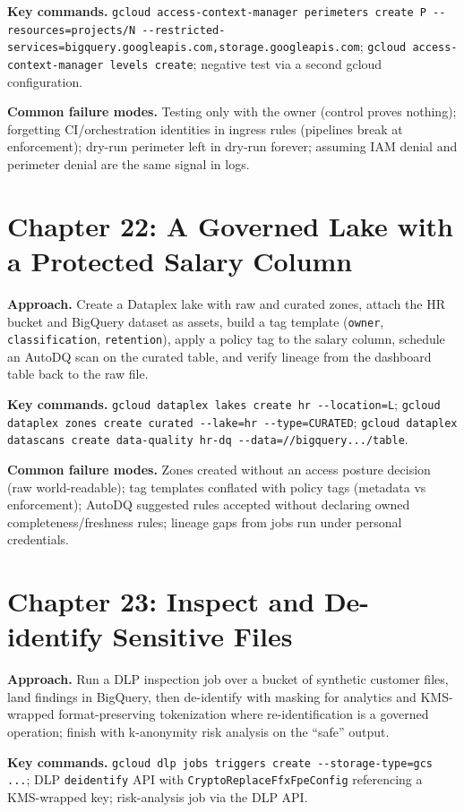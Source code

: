 \textbf{Key commands.} \texttt{gcloud access-context-manager perimeters create P
-{}-resources=projects/N -{}-restricted-services=bigquery.googleapis.com,storage.googleapis.com};
\texttt{gcloud access-context-manager levels create}; negative test via a second gcloud
configuration.

\textbf{Common failure modes.} Testing only with the owner (control proves nothing); forgetting
CI/orchestration identities in ingress rules (pipelines break at enforcement); dry-run perimeter
left in dry-run forever; assuming IAM denial and perimeter denial are the same signal in logs.

\section{Chapter 22: A Governed Lake with a Protected Salary Column}
\textbf{Approach.} Create a Dataplex lake with raw and curated zones, attach the HR bucket and
BigQuery dataset as assets, build a tag template (\texttt{owner}, \texttt{classification},
\texttt{retention}), apply a policy tag to the salary column, schedule an AutoDQ scan on the
curated table, and verify lineage from the dashboard table back to the raw file.

\textbf{Key commands.} \texttt{gcloud dataplex lakes create hr -{}-location=L};
\texttt{gcloud dataplex zones create curated -{}-lake=hr -{}-type=CURATED};
\texttt{gcloud dataplex datascans create data-quality hr-dq -{}-data=//bigquery.../table}.

\textbf{Common failure modes.} Zones created without an access posture decision (raw world-readable);
tag templates conflated with policy tags (metadata vs enforcement); AutoDQ suggested rules accepted
without declaring owned completeness/freshness rules; lineage gaps from jobs run under personal
credentials.

\section{Chapter 23: Inspect and De-identify Sensitive Files}
\textbf{Approach.} Run a DLP inspection job over a bucket of synthetic customer files, land
findings in BigQuery, then de-identify with masking for analytics and KMS-wrapped format-preserving
tokenization where re-identification is a governed operation; finish with k-anonymity risk analysis
on the ``safe'' output.

\textbf{Key commands.} \texttt{gcloud dlp jobs triggers create -{}-storage-type=gcs ...}; DLP
\texttt{deidentify} API with \texttt{CryptoReplaceFfxFpeConfig} referencing a KMS-wrapped key;
risk-analysis job via the DLP API.

